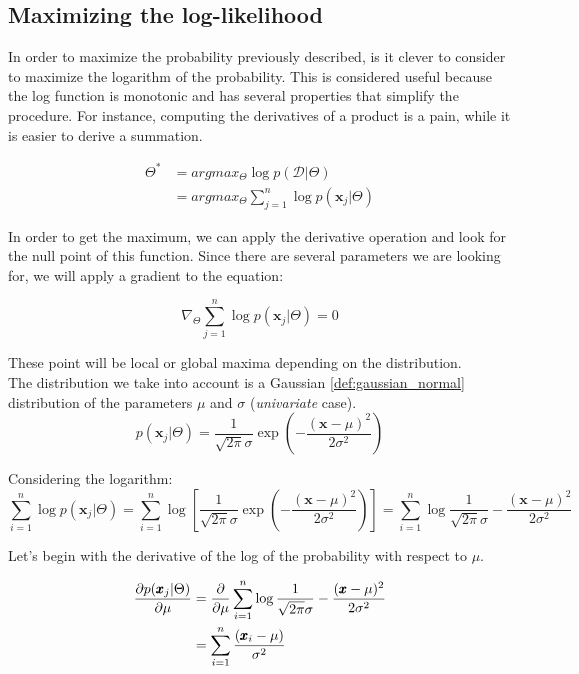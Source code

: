     \subsection{Maximizing the log-likelihood}
        In order to maximize the probability previously described, is it clever to consider to maximize the logarithm of the probability.
        This is considered useful because the log function is monotonic and has several properties that simplify the procedure. For instance, computing the derivatives of a product is a pain, while it is easier to derive a summation.
        
        \begin{align*}
    		\Theta^* &= argmax_{\Theta} \log p(\mathcal{D} | \Theta)\\
    		&= argmax_\Theta \sum_{j=1}^n \log p(\pmb{x}_j|\Theta)
    	\end{align*}    
        
        In order to get the maximum, we can apply the derivative operation and look for the null point of this function. Since there are several parameters we are looking for, we will apply a gradient to the equation:
        
        \begin{equation}
            \nabla _\Theta \sum_{j=1} ^n \log p(\pmb{x}_j|\Theta) = 0
        \end{equation}
        
        These point will be local or global maxima depending on the distribution.\\
        
        The distribution we take into account is a Gaussian \ref{def:gaussian_normal} distribution of the parameters $\mu$ and $\sigma$ (\textit{univariate} case).
        $$p(\pmb{x}_j|\Theta) = \frac{1}{\sqrt{2\pi}\sigma} \exp{(-\frac{(\pmb{x}-\mu)^2}{2\sigma ^2})} $$
        
        Considering the logarithm:
        $$\sum_{i=1}^n \log p(\pmb{x}_j|\Theta) = \sum_{i=1}^n \log{ \left[ \frac{1}{\sqrt{2\pi}\sigma} \exp{(-\frac{(\pmb{x}-\mu)^2}{2\sigma ^2})} \right] } = \sum_{i=1}^n \log{ \frac{1}{\sqrt{2\pi}\sigma}}-\frac{(\pmb{x}-\mu)^2}{2\sigma ^2}$$
        
        Let's begin with the derivative of the log of the probability with respect to $\mu$.
        
        \begin{align*}
        \pdv {p(\pmb{x}_j|\Theta)}{\mu} &= \pdv{}{\mu} \sum_{i=1}^n \log \frac{1}{\sqrt{2\pi}\sigma} - \frac{(\pmb{x}-\mu)^2}{2\sigma^2}\\
    	&= \sum_{i=1} ^n \frac{(\pmb{x}_i - \mu)}{\sigma^2}
    	\end{align*}
    	
